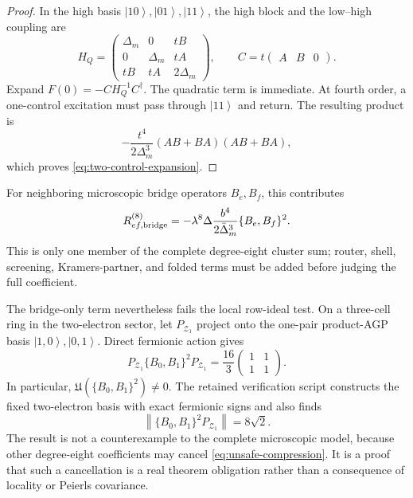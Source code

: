 \documentclass[11pt]{article}
\theoremstyle{definition}
\theoremstyle{remark}
\newcommand{\cZ}{\mathcal Z}
\newcommand{\norm}[1]{\left\lVert #1\right\rVert}
\newcommand{\ket}[1]{\left|#1\right\rangle}
\begin{document}
\begin{proof}
In the high basis $\ket{10},\ket{01},\ket{11}$, the high block and the
low--high coupling are
\begin{equation}
 H_Q=
 \begin{pmatrix}
 \Delta_m&0&tB\\
 0&\Delta_m&tA\\
 tB&tA&2\Delta_m
 \end{pmatrix},
 \qquad
 C=t\begin{pmatrix}A&B&0\end{pmatrix}.
 \label{eq:two-control-block}
\end{equation}
Expand $F(0)=-CH_Q^{-1}C^\dagger$.  The quadratic term is immediate.  At
fourth order, a one-control excitation must pass through $\ket{11}$ and return.
The resulting product is
\begin{equation}
 -\frac{t^4}{2\Delta_m^3}
 (AB+BA)(AB+BA),
\end{equation}
which proves \eqref{eq:two-control-expansion}.
\end{proof}

For neighboring microscopic bridge operators $B_e,B_f$, this contributes
\begin{equation}
 R_{ef,\rm bridge}^{(8)}
 =-\lambda^8\Delta\frac{b^4}{2\bar\Delta_m^3}
 \{B_e,B_f\}^2.
 \label{eq:bridge-overlap}
\end{equation}
This is only one member of the complete degree-eight cluster sum; router,
shell, screening, Kramers-partner, and folded terms must be added before
judging the full coefficient.

The bridge-only term nevertheless fails the local row-ideal test.  On a
three-cell ring in the two-electron sector, let $P_{\cZ_1}$ project onto the
one-pair product-AGP basis $\ket{1,0},\ket{0,1}$.  Direct fermionic action gives
\begin{equation}
 \boxed{
 P_{\cZ_1}\{B_0,B_1\}^2P_{\cZ_1}
 =\frac{16}{3}
 \begin{pmatrix}1&1\\1&1\end{pmatrix}.}
 \label{eq:unsafe-compression}
\end{equation}
In particular, $\mathfrak U(\{B_0,B_1\}^2)\ne0$.  The retained verification
script constructs the fixed two-electron basis with exact fermionic signs and
also finds
\begin{equation}
 \norm{\{B_0,B_1\}^2P_{\cZ_1}}=8\sqrt2.
 \label{eq:unsafe-source-norm}
\end{equation}
The result is not a counterexample to the complete microscopic model, because
other degree-eight coefficients may cancel \eqref{eq:unsafe-compression}.  It
is a proof that such a cancellation is a real theorem obligation rather than
a consequence of locality or Peierls covariance.
\end{document}
